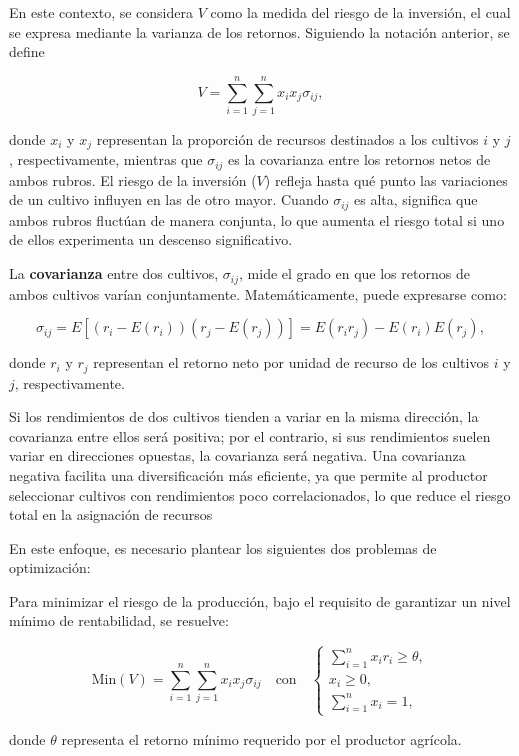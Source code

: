 \documentclass[
  letterpaper,
  DIV=11,
  numbers=noendperiod]{scrartcl}
\begin{document}
En este contexto, se considera \(V\) como la medida del riesgo de la
inversión, el cual se expresa mediante la varianza de los retornos.
Siguiendo la notación anterior, se define

\[
V = \sum_{i=1}^n \sum_{j=1}^n x_i x_j \sigma_{ij},
\]

donde \(x_i\) y \(x_j\) representan la proporción de recursos destinados
a los cultivos \(i\) y \(j\), respectivamente, mientras que
\(\sigma_{ij}\) es la covarianza entre los retornos netos de ambos
rubros. El riesgo de la inversión (\(V\)) refleja hasta qué punto las
variaciones de un cultivo influyen en las de otro mayor. Cuando
\(\sigma_{ij}\) es alta, significa que ambos rubros fluctúan de manera
conjunta, lo que aumenta el riesgo total si uno de ellos experimenta un
descenso significativo.

La \textbf{covarianza} entre dos cultivos, \(\sigma_{ij}\), mide el
grado en que los retornos de ambos cultivos varían conjuntamente.
Matemáticamente, puede expresarse como:

\[
\sigma_{ij} = E\left[(r_i - E(r_i))(r_j - E(r_j))\right] = E(r_i r_j) - E(r_i)E(r_j),
\]

donde \(r_i\) y \(r_j\) representan el retorno neto por unidad de
recurso de los cultivos \(i\) y \(j\), respectivamente.

Si los rendimientos de dos cultivos tienden a variar en la misma
dirección, la covarianza entre ellos será positiva; por el contrario, si
sus rendimientos suelen variar en direcciones opuestas, la covarianza
será negativa. Una covarianza negativa facilita una diversificación más
eficiente, ya que permite al productor seleccionar cultivos con
rendimientos poco correlacionados, lo que reduce el riesgo total en la
asignación de recursos

En este enfoque, es necesario plantear los siguientes dos problemas de
optimización:

Para minimizar el riesgo de la producción, bajo el requisito de
garantizar un nivel mínimo de rentabilidad, se resuelve:

\[
\text{Min}(V) = \sum_{i=1}^n \sum_{j=1}^n x_i x_j \sigma_{ij} \quad \text{con} \quad 
\begin{cases}
\sum_{i=1}^n x_i r_i \geq \theta, \\
x_i \geq 0, \\
\sum_{i=1}^n x_i = 1,
\end{cases}
\]

donde \(\theta\) representa el retorno mínimo requerido por el productor
agrícola.
\end{document}
